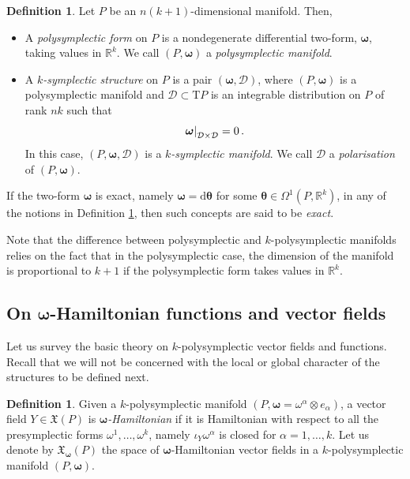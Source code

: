 \documentclass[11pt]{article}
\theoremstyle{plain}
\theoremstyle{definition}
\newtheorem{definition}[theorem]{Definition}
\newcommand\restr[2]{{%
  \left.\kern-\nulldelimiterspace %
  #1 %
  \right|_{#2} %
}}
\newcommand{\T}{\mathrm{T}}
\newcommand{\bomega}{{\boldsymbol{\omega}}}
\renewcommand{\d}{\mathrm{d}}
\newcommand*{\inn}[1]{\iota_{#1}}
\newcommand{\X}{\mathfrak{X}}
\def\d{\mathrm{d}}
\numberwithin{equation}{section}
\begin{document}
\begin{definition}\label{Def::CoNotions}
    Let $P$ be an $n(k+1)$-dimensional manifold. Then,
    \begin{itemize}
        \item A {\it polysymplectic form} on $P$ is a nondegenerate differential two-form, $\bomega$, taking values in $\mathbb{R}^k$. 
        We call $(P,\boldsymbol{\omega})$ a {\it polysymplectic manifold}.
        \item A {\it $k$-symplectic structure} on $P$ is a pair $(\boldsymbol{\omega},\mathcal{D})$, where $(P,\boldsymbol{\omega})$ is a polysymplectic manifold and $\mathcal{D}\subset \T P$ is an integrable distribution on $P$ of rank $nk$ such that
        \[
        \restr{\boldsymbol{\omega}}{\mathcal{D}\times \mathcal{D}} = 0\,.
        \]
        In this case, $(P,\boldsymbol{\omega},\mathcal{D})$ is a {\it $k$-symplectic manifold}. We call $\mathcal{D}$ a {\it polarisation} of $(P,\boldsymbol{\omega})$.
    \end{itemize}
    If the two-form $\boldsymbol{\omega}$ is exact, namely $\boldsymbol{\omega} = \d\boldsymbol{\theta}$ for some $\boldsymbol{\theta} \in\Omega^1(P,\mathbb{R}^k)$, in any of the notions in Definition \ref{Def::CoNotions}, then such concepts are said to be {\it exact}.
\end{definition}



Note that the difference between polysymplectic and $k$-polysymplectic manifolds relies on the fact that in the polysymplectic case, the dimension of the manifold is proportional to $k+1$ if the polysymplectic form takes values in $\mathbb{R}^k$.






\subsection{On \texorpdfstring{$\bomega$}{}-Hamiltonian functions and vector fields}\label{OHam}

Let us survey the basic theory on $k$-polysymplectic vector fields and functions. Recall that we will not be concerned with the local or global character of the structures to be defined next.

\begin{definition}
Given a $k$-polysymplectic manifold $(P,\bomega=\omega^\alpha\otimes e_\alpha)$, a vector field $Y\in\X(P)$ is {\it $\boldsymbol{\omega}$-Hamiltonian} if it is Hamiltonian with respect to all the presymplectic forms $\omega^1,\dotsc,\omega^k$, namely $\inn{Y}\omega^\alpha$ is closed for $\alpha = 1,\dotsc,k$. Let us denote by $\X_\bomega(P)$ the space of $\bomega$-Hamiltonian vector fields in a $k$-polysymplectic manifold $(P,\bomega)$.

\end{definition}
\end{document}
